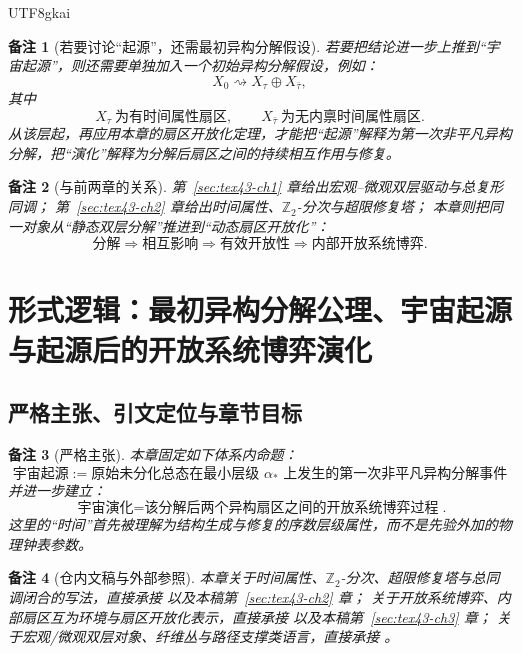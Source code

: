 \documentclass[12pt]{article}
\newtheorem{remark}{备注}[section]
\newcommand{\Ztwo}{\mathbb{Z}_2}
\begin{document}
\begin{CJK*}{UTF8}{gkai}
\begin{remark}[若要讨论“起源”，还需最初异构分解假设]
若要把结论进一步上推到“宇宙起源”，则还需要单独加入一个初始异构分解假设，例如：
\[
  X_0 \rightsquigarrow X_{\tau}\oplus X_{\bar\tau},
\]
其中
\[
  X_{\tau}\ \text{为有时间属性扇区},
  \qquad
  X_{\bar\tau}\ \text{为无内禀时间属性扇区}.
\]
从该层起，再应用本章的扇区开放化定理，才能把“起源”解释为第一次非平凡异构分解，把“演化”解释为分解后扇区之间的持续相互作用与修复。
\end{remark}

\begin{remark}[与前两章的关系]
第~\ref{sec:tex43-ch1} 章给出宏观--微观双层驱动与总复形同调；
第~\ref{sec:tex43-ch2} 章给出时间属性、\(\Ztwo\)-分次与超限修复塔；
本章则把同一对象从“静态双层分解”推进到“动态扇区开放化”：
\[
  \text{分解}
  \Longrightarrow
  \text{相互影响}
  \Longrightarrow
  \text{有效开放性}
  \Longrightarrow
  \text{内部开放系统博弈}.
\]
\end{remark}

\clearpage

\section{形式逻辑：最初异构分解公理、宇宙起源与起源后的开放系统博弈演化}
\label{sec:tex43-ch4}

\subsection{严格主张、引文定位与章节目标}
\label{subsec:tex43-ch4-convention}

\begin{remark}[严格主张]
本章固定如下体系内命题：
\[
  \boxed{
    \text{宇宙起源}
    :=
    \text{原始未分化总态在最小层级 }\alpha_\ast\text{ 上发生的第一次非平凡异构分解事件}
  }
\]
并进一步建立：
\[
  \boxed{
    \text{宇宙演化}
    =
    \text{该分解后两个异构扇区之间的开放系统博弈过程}
  }.
\]
这里的“时间”首先被理解为结构生成与修复的序数层级属性，而不是先验外加的物理钟表参数。
\end{remark}

\begin{remark}[仓内文稿与外部参照]
本章关于时间属性、\(\Ztwo\)-分次、超限修复塔与总同调闭合的写法，直接承接
\cite{RepoTex29RepairableObstruction,RepoTex27PowerdomainFiberExtension} 以及本稿第~\ref{sec:tex43-ch2} 章；
关于开放系统博弈、内部扇区互为环境与扇区开放化表示，直接承接
\cite{RepoTex23OpenSystemGame,RepoTex39StatRepair} 以及本稿第~\ref{sec:tex43-ch3} 章；
关于宏观/微观双层对象、纤维丛与路径支撑类语言，直接承接
\cite{RepoTex36HomotopyTwistBijection,RepoTex38JacobiBianchiRepair,GaoZheng2025GFramework,GaoZhengAppVol3}。


\end{remark}
\end{CJK*}
\end{document}
